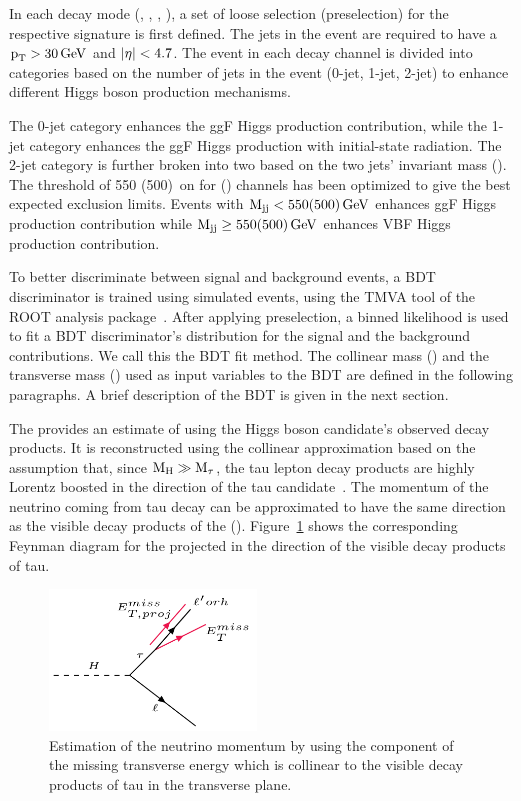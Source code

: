 In each decay mode (\emu, \ehad, \mue, \muhad), a set of loose selection (preselection) for the respective signature is first defined. The jets in the event are required to have a $\text{p}_\text{T} > 30 \,\text{Ge\hspace{-.08em}V}$ and $\lvert\eta\rvert < 4.7$. The event in each decay channel is divided into categories based on the number of jets in the event (0-jet, 1-jet, 2-jet) to enhance different Higgs boson production mechanisms.

The 0-jet category enhances the ggF Higgs production contribution, while the 1-jet category enhances the ggF Higgs production with initial-state radiation. The 2-jet category is further broken into two based on the two jets' invariant mass (\mjj). The threshold of 550 (500)~\GeV on \mjj for \mutau(\etau) channels has been optimized to give the best expected exclusion limits. Events with $\text{M}_{\text{jj}} < 550(500) \,\text{Ge\hspace{-.08em}V}$ enhances ggF Higgs production contribution while $\text{M}_{\text{jj}} \ge 550(500) \,\text{Ge\hspace{-.08em}V}$ enhances VBF Higgs production contribution.

To better discriminate between signal and background events, a BDT discriminator is trained using simulated events, using the TMVA tool of the ROOT analysis package~\cite{Hocker:2007ht}. After applying preselection, a binned likelihood is used to fit a BDT discriminator's distribution for the signal and the background contributions. We call this the BDT fit method. The collinear mass (\mcol) and the transverse mass (\mtl) used as input variables to the BDT are defined in the following paragraphs. A brief description of the BDT is given in the next section.

The \mcol provides an estimate of \mh using the Higgs boson candidate's observed decay products. It is reconstructed using the collinear approximation based on the assumption that, since $\text{M}_{\text{H}} \gg \text{M}_\tau$, the tau lepton decay products are highly Lorentz boosted in the direction of the tau candidate~\cite{Ellis:1987xu}. The momentum of the neutrino coming from tau decay can be approximated to have the same direction as the visible decay products of the \Pgt(\vectvis). Figure~\ref{fig:METproj} shows the corresponding Feynman diagram for the \met projected in the direction of the visible decay products of tau.

\begin{figure}[htbp]
  \centering
  \includegraphics[width=0.49\textwidth]{plots/chapter6/Feynman/METproj.png}
  \caption{Estimation of the neutrino momentum \metproj by using the component of the missing transverse energy \met which is collinear to the visible decay products of tau in the transverse plane.}
  \label{fig:METproj}
\end{figure}

